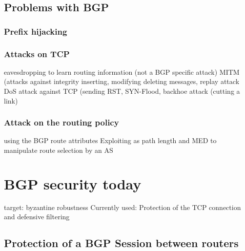 \documentclass[12pt]{IEEEtran}
\begin{document}
	\subsection{Problems with BGP}
		\subsubsection{Prefix hijacking}
		
       	\subsubsection{Attacks on TCP}
		eavesdropping to learn routing information (not a BGP specific attack)
		MITM (attacks against integrity
			inserting, modifying deleting messages, replay attack
		DoS attack against TCP 
			(sending RST, SYN-Flood, backhoe attack (cutting a link)
		\subsubsection{Attack on the routing policy} 
			using the BGP route attributes
		Exploiting as path length and MED to manipulate route selection by an AS



       \section{BGP security today}
	target:	byzantine robustness
	Currently used: Protection of the TCP connection and defensive filtering
	


	\subsection{Protection of a BGP Session between routers}
%
%					
%
%				
%				
%			
%
%
\end{document}
